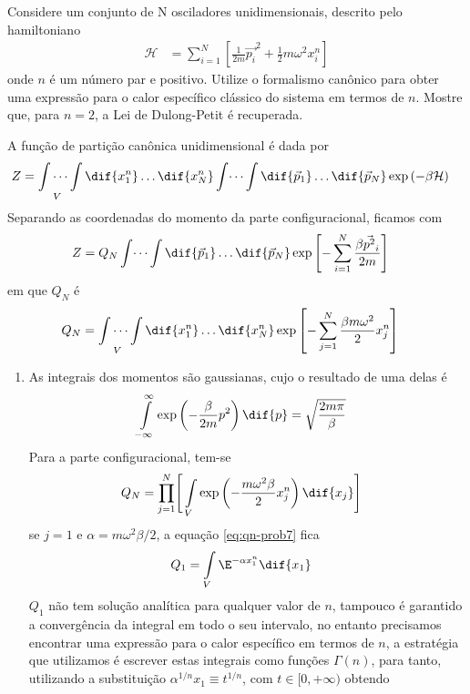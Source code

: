\begin{prob}
  Considere um conjunto de N osciladores unidimensionais, descrito pelo hamiltoniano
  \begin{align}
    \mathcal{H}&=\sum_{i=1}^N\left[\frac{1}{2m}\vec{p_i}^2+\frac{1}{2}m\omega^2x^n_i\right]
  \end{align}
  onde $n$ é um número par e positivo. Utilize o formalismo canônico para obter uma expressão para o calor específico clássico do sistema em termos de $n$. Mostre que, para $n=2$, a Lei de Dulong-Petit é recuperada.
  \begin{sol}
    A função de partição canônica unidimensional é dada por 
    \begin{align}
      Z&=\idotsint\limits_{V}\dif{x_1^n}\dots\dif{x_N^n}\int \dots \int \dif{\vec{p}_1}\dots\dif{\vec{p}_N}\exp\left(-\beta\mathcal{H}\right)
    \end{align}
    Separando as coordenadas do momento da parte configuracional, ficamos com
    \begin{align}
      Z&=Q_N\int \dots \int \dif{\vec{p}_1}\dots\dif{\vec{p}_N}\exp\left[-\sum_{i=1}^N\frac{\beta\vec{p^2}_i}{2m}\right]
    \end{align}
    em que $Q_N$ é
    \begin{align}
      Q_N&=\idotsint\limits_{V}\dif{x_1^n}\dots\dif{x_N^n}\exp\left[-\sum_{j=1}^N\frac{\beta m\omega^2}{2}x_j^n\right]
    \end{align}
    \begin{enumerate}[label=\alph *)]
      \item As integrais dos momentos são gaussianas, cujo o resultado de uma delas é
      \begin{align}
        \int\limits_{-\infty}^\infty \exp\left(-\frac{\beta}{2m}p^2\right) \dif{p}&=\sqrt{\frac{2m\pi}{\beta}}
      \end{align}
      Para a parte configuracional, tem-se 
      \begin{align}
        \label{eq:qn-prob7}
        Q_N&=\prod_{j=1}^N\Biggl[\,\int\limits_{V} \exp\left(-\frac{m\omega^2\beta}{2}x_j^n\right) \dif{x_j}\Biggr]
      \end{align}
      se $j=1$ e $\alpha=m\omega^2\beta/2$, a equação \eqref{eq:qn-prob7} fica
      \begin{align}
        \label{eq:int1-prob7}
        Q_1&=\int\limits_{V}\E^{-\alpha x_1^n}\dif{x_1}
      \end{align}
      $Q_1$ não tem solução analítica para qualquer valor de $n$, tampouco é garantido a convergência da integral em todo o seu intervalo, no entanto precisamos encontrar uma expressão para o calor específico em termos de $n$, a estratégia que utilizamos é escrever estas integrais como funções $\Gamma(n)$, para tanto, utilizando a substituição $\alpha^{1/n} x_1\equiv t^{1/n}$, com $t\in [0,+\infty)$ obtendo

\end{enumerate}
\end{sol}
\end{prob}
